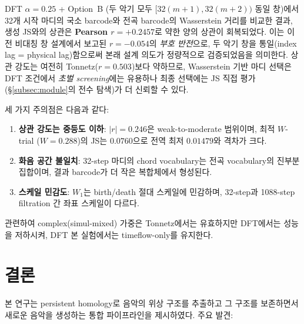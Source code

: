 \documentclass[conference,10pt,a4paper]{IEEEtran}
\begin{document}
DFT $\alpha=0.25$ + Option~B (두 악기 모두 $[32(m+1),32(m+2))$ 동일 창)에서
32개 시작 마디의 국소 barcode와 전곡 barcode의 Wasserstein 거리를 비교한 결과,
생성 JS와의 상관은 \textbf{Pearson $r=+0.2457$}로 약한 양의 상관이 회복되었다.
이는 이전 비대칭 창 설계에서 보고된 $r=-0.054$의 \emph{부호 반전}으로,
두 악기 창을 통일(index lag = physical lag)함으로써 본래 설계 의도가 정량적으로
검증되었음을 의미한다. 상관 강도는 여전히 Tonnetz($r=0.503$)보다 약하므로,
Wasserstein 기반 마디 선택은 DFT 조건에서 \emph{초벌 screening}에는 유용하나
최종 선택에는 JS 직접 평가(§\ref{subsec:module}의 전수 탐색)가 더 신뢰할 수 있다.

세 가지 주의점은 다음과 같다:
\begin{enumerate}[nosep]
\item \textbf{상관 강도는 중등도 이하}: $|r|=0.246$은 weak-to-moderate 범위이며,
      최적 $W$-trial ($W=0.288$)의 JS는 $0.0760$으로 전역 최저 $0.01479$와 격차가 크다.
\item \textbf{화음 공간 불일치}: 32-step 마디의 chord vocabulary는
      전곡 vocabulary의 진부분집합이며, 결과 barcode가 더 작은 복합체에서 형성된다.
\item \textbf{스케일 민감도}: $W_1$는 birth/death 절대 스케일에 민감하며,
      32-step과 1088-step filtration 간 좌표 스케일이 다르다.
\end{enumerate}

관련하여 complex(simul-mixed) 가중은 Tonnetz에서는 유효하지만
DFT에서는 성능을 저하시켜, DFT 본 실험에서는 timeflow-only를 유지한다.


\section{결론}
\label{sec:conclusion}

본 연구는 persistent homology로 음악의 위상 구조를 추출하고
그 구조를 보존하면서 새로운 음악을 생성하는 통합 파이프라인을
제시하였다. 주요 발견:
\end{document}
